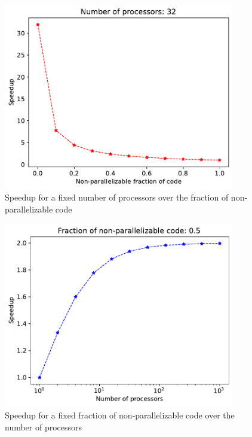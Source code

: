\begin{figure}[h]
\centering
\includegraphics[width=0.9\textwidth]{FixProc.pdf}
\caption{Speedup for a fixed number of processors over the fraction of non-parallelizable code}
\label{FixProc}
\end{figure}

\begin{figure}[h]
\centering
\includegraphics[width=0.9\textwidth]{FixFrac.pdf}
\caption{Speedup for a fixed fraction of non-parallelizable code over the number of processors}
\label{FixFrac}
\end{figure}



